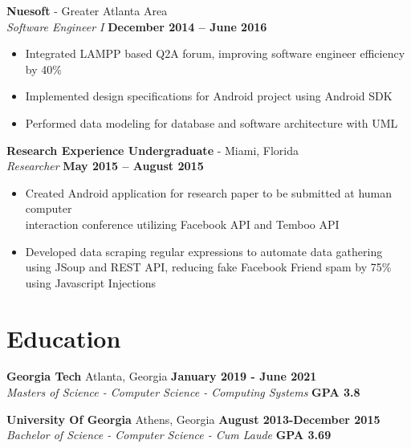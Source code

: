 \documentclass[margin,line]{resume}
\begin{document}
\begin{resume}
\begin{itemize}
	\end{itemize}

	\textbf{Nuesoft} - Greater Atlanta Area \vspace{1mm}\\\vspace{1mm}%
	\textsl{Software Engineer I} \hfill \textbf{December 2014 -- June 2016}
	\begin{itemize}
	 	\item Integrated LAMPP based Q2A forum, improving software engineer efficiency by 40\%
	 	\item Implemented design specifications for Android project using Android SDK
	 	\item Performed data modeling for database and software architecture with UML 
	\end{itemize}

	\textbf{Research Experience Undergraduate} - Miami, Florida \vspace{1mm}\\\vspace{1mm}%
	\textsl{Researcher} \hfill \textbf{May 2015 -- August 2015}
	\begin{itemize}
		\item Created Android application for research paper to be submitted at human computer\\
		interaction conference utilizing Facebook API and Temboo API
		\item Developed data scraping regular expressions to automate data gathering using JSoup and REST API, reducing fake Facebook Friend spam by 75\% using Javascript Injections
	\end{itemize}
	
	
	\section{\mysidestyle Education}
	
	\textbf{Georgia Tech} Atlanta, Georgia \hfill \textbf{January 2019 - June 2021}\\
	\textsl{Masters of Science - Computer Science - Computing Systems} \hfill \textbf{GPA 3.8} 
	
	\textbf{University Of Georgia} Athens, Georgia \hfill \textbf{August 2013-December 2015} \\
	\textsl{Bachelor of Science - Computer Science - Cum Laude} \hfill \textbf{GPA 3.69}
	\end{resume}
	
\end{document}
